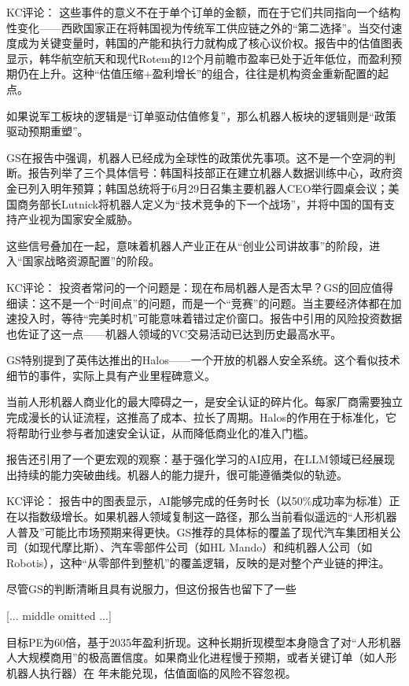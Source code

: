\documentclass[11pt]{ctexart}
\begin{document}
KC评论： 这些事件的意义不在于单个订单的金额，而在于它们共同指向一个结构性变化——西欧国家正在将韩国视为传统军工供应链之外的“第二选择”。当交付速度成为关键变量时，韩国的产能和执行力就构成了核心议价权。报告中的估值图表显示，韩华航空航天和现代Rotem的12个月前瞻市盈率已处于近年低位，而盈利预期仍在上升。这种“估值压缩+盈利增长”的组合，往往是机构资金重新配置的起点。

如果说军工板块的逻辑是“订单驱动估值修复”，那么机器人板块的逻辑则是“政策驱动预期重塑”。

GS在报告中强调，机器人已经成为全球性的政策优先事项。这不是一个空洞的判断。报告列举了三个具体信号：韩国科技部正在建立机器人数据训练中心，政府资金已列入明年预算；韩国总统将于6月29日召集主要机器人CEO举行圆桌会议；美国商务部长Lutnick将机器人定义为“技术竞争的下一个战场”，并将中国的国有支持产业视为国家安全威胁。

这些信号叠加在一起，意味着机器人产业正在从“创业公司讲故事”的阶段，进入“国家战略资源配置”的阶段。

KC评论： 投资者常问的一个问题是：现在布局机器人是否太早？GS的回应值得细读：这不是一个“时间点”的问题，而是一个“竞赛”的问题。当主要经济体都在加速投入时，等待“完美时机”可能意味着错过定价窗口。报告中引用的风险投资数据也佐证了这一点——机器人领域的VC交易活动已达到历史最高水平。

GS特别提到了英伟达推出的Halos——一个开放的机器人安全系统。这个看似技术细节的事件，实际上具有产业里程碑意义。

当前人形机器人商业化的最大障碍之一，是安全认证的碎片化。每家厂商需要独立完成漫长的认证流程，这推高了成本、拉长了周期。Halos的作用在于标准化，它将帮助行业参与者加速安全认证，从而降低商业化的准入门槛。

报告还引用了一个更宏观的观察：基于强化学习的AI应用，在LLM领域已经展现出持续的能力突破曲线。机器人的能力提升，很可能遵循类似的轨迹。

KC评论： 报告中的图表显示，AI能够完成的任务时长（以50\%成功率为标准）正在以指数级增长。如果机器人领域复制这一路径，那么当前看似遥远的“人形机器人普及”可能比市场预期来得更快。GS推荐的具体标的覆盖了现代汽车集团相关公司（如现代摩比斯）、汽车零部件公司（如HL Mando）和纯机器人公司（如Robotis），这种“从零部件到整机”的覆盖逻辑，反映的是对整个产业链的押注。

尽管GS的判断清晰且具有说服力，但这份报告也留下了一些

[... middle omitted ...]

目标PE为60倍，基于2035年盈利折现。这种长期折现模型本身隐含了对“人形机器人大规模商用”的极高置信度。如果商业化进程慢于预期，或者关键订单（如人形机器人执行器）在 年未能兑现，估值面临的风险不容忽视。
\end{document}
